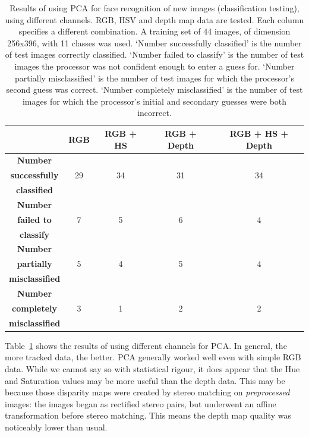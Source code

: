 \begin{table}[h!]
  \centering
  \begin{tabular}{c c c c c}
    \toprule
    \textbf{ } & \textbf{ RGB } & \textbf{ RGB + HS } & \textbf{RGB + Depth} & \textbf{RGB + HS + Depth}\\
    \midrule
    \textbf{Number} & {} & {} & {} & {} \\
    \textbf{successfully} & 29 & 34 & 31 & 34\\
    \textbf{classified} & {} & {} & {} & {} \\
    \midrule
    \textbf{Number} & {} & {} & {} & {} \\
    \textbf{failed to} & 7 & 5 & 6 & 4\\
    \textbf{classify} & {} & {} & {} & {} \\
    \midrule
    \textbf{Number} & {} & {} & {} & {} \\
    \textbf{partially} & 5 & 4 & 5 & 4\\
    \textbf{misclassified} & {} & {} & {} & {} \\
    \midrule
    \textbf{Number} & {} & {} & {} & {} \\
    \textbf{completely} & 3 & 1 & 2 & 2\\
    \textbf{misclassified} & {} & {} & {} & {} \\
    \bottomrule
  \end{tabular}
  \caption[Results of classification testing for different numbers of channels]{Results of using PCA for face recognition of new images (classification testing), using different channels. RGB, HSV and depth map data are tested. Each column specifies a different combination. A training set of 44 images, of dimension 256x396, with 11 classes was used. `Number successfully classified' is the number of test images correctly classified. `Number failed to classify' is the number of test images the processor was not confident enough to enter a guess for. `Number partially misclassified' is the number of test images for which the processor's second guess was correct. `Number completely misclassified' is the number of test images for which the processor's initial and secondary guesses were both incorrect.}
  \label{tbl:face-rec-4}
\end{table}

Table~\ref{tbl:face-rec-4} shows the results of using different channels for PCA. In general, the more tracked data, the better. PCA generally worked well even with simple RGB data. While we cannot say so with statistical rigour, it does appear that the Hue and Saturation values may be more useful than the depth data. This may be because those disparity maps were created by stereo matching on \emph{preprocessed} images: the images began as rectified stereo pairs, but underwent an affine transformation before stereo matching. This means the depth map quality was noticeably lower than usual.


